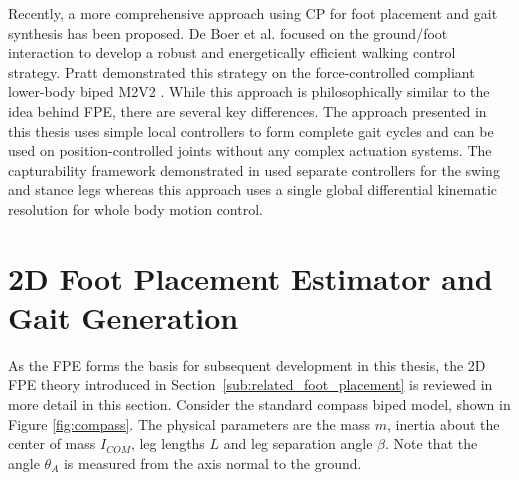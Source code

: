 Recently, a more comprehensive approach using CP for foot placement and gait synthesis has been proposed. De Boer et al. \cite{DeBoer:2012wp,Koolen2012} focused on the ground/foot interaction to develop a robust and energetically efficient walking control strategy. Pratt demonstrated this strategy on the force-controlled compliant lower-body biped M2V2 \cite{Pratt2008,Pratt2012}. While this approach is philosophically similar to the idea behind FPE, there are several key differences. The approach presented in this thesis uses simple local controllers to form complete gait cycles and can be used on position-controlled joints without any complex actuation systems. The capturability framework demonstrated in \cite{Koolen2012,Pratt2012} used separate controllers for the swing and stance legs whereas this approach uses a single global differential kinematic resolution for whole body motion control.








\section{2D Foot Placement Estimator and Gait Generation} %
\label{sec:fpe_algorithm}
As the FPE forms the basis for subsequent development in this thesis, the 2D FPE theory \cite{Wight:2008ii,Wight:2008vt} introduced in Section~\ref{sub:related_foot_placement} is reviewed in more detail in this section. Consider the standard compass biped model, shown in Figure \ref{fig:compass}. The physical parameters are the mass $m$, inertia about the center of mass $I_{COM}$, leg lengths $L$ and leg separation angle $\beta$. Note that the angle $\theta_A$ is measured from the axis normal to the ground. 

